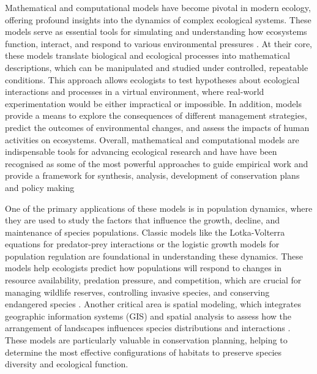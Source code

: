 Mathematical and computational models have become pivotal in modern ecology,
offering profound insights into the dynamics of complex ecological systems.
These models serve as essential tools for simulating and understanding how
ecosystems function, interact, and respond to various environmental pressures
\cite{HOCH19983}. At their core, these models translate biological and
ecological processes into mathematical descriptions, which can be manipulated
and studied under controlled, repeatable conditions. This approach allows
ecologists to test hypotheses about ecological interactions and processes in a
virtual environment, where real-world experimentation would be either
impractical or impossible. In addition, models provide a means to explore the
consequences of different management strategies, predict the outcomes of
environmental changes, and assess the impacts of human activities on
ecosystems. Overall, mathematical and computational models are indispensable
tools for advancing ecological research and have have been recognised as some
of the most powerful approaches to guide empirical work and provide a framework
for synthesis, analysis, development of conservation plans and policy making
\cite{levin1992mathematics,murray1989mathematical,sarkar2006biodiversity}

One of the primary applications of these models is in population dynamics,
where they are used to study the factors that influence the growth, decline,
and maintenance of species populations. Classic models like the Lotka-Volterra
equations for predator-prey interactions or the logistic growth models for
population regulation are foundational in understanding these dynamics. These
models help ecologists predict how populations will respond to changes in
resource availability, predation pressure, and competition, which are crucial
for managing wildlife reserves, controlling invasive species, and conserving
endangered species \addref. Another critical area is spatial modeling, which
integrates geographic information systems (GIS) and spatial analysis to assess
how the arrangement of landscapes influences species distributions and
interactions \addref. These models are particularly valuable in conservation
planning,
helping to determine the most effective configurations of habitats to preserve
species diversity and ecological function.

